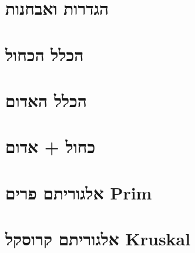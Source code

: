 \documentclass[]{article}
\def\insert#1{}
\begin{document}
\def\lecnum{4}
\def\topcis{
עץ פורש מינימלי
}

\section*{הגדרות ואבחנות}
\insert{preliminary}
\section*{הכלל הכחול}
\insert{blue}
\section*{הכלל האדום}
\insert{red}
\section*{כחול + אדום}
\insert{bluered}
\section*{אלגוריתם פרים
\textenglish{Prim}
}
\insert{prim}
\section*{אלגוריתם קרוסקל
\textenglish{Kruskal}
}
\insert{kruskal}
\end{document}
